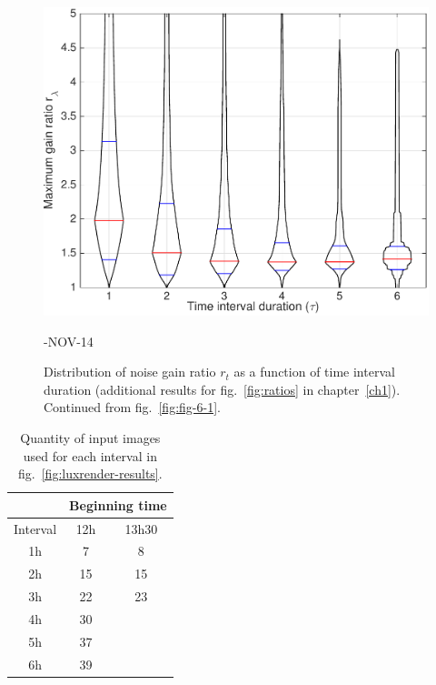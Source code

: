 \begin{figure}
\includegraphics[width=\mylength]{dist/20141114-maxGain-local-relativePerf} \\
\parbox{\mylength}{-NOV-14}
\caption[Distribution of noise gain ratio $r_t$ (cont.)]{Distribution of noise gain ratio $r_t$ as a function of time interval duration (additional results for fig.~\ref{fig:ratios} in chapter~\ref{ch1}). Continued from fig.~\ref{fig:fig-6-1}.}
\label{fig:fig-6-2}
\end{figure}


\FloatBarrier
\begin{table}
\centering
\begin{tabular}{|c|c|c|} \hline
 & \multicolumn{2}{|c|}{Beginning time} \\ \hline
Interval & 12h & 13h30 \\ \hline \hline
1h & 7 & 8 \\ \hline
2h & 15 & 15 \\ \hline
3h & 22 & 23 \\ \hline
4h & 30 &  \\ \hline
5h & 37 &  \\ \hline
6h & 39 &  \\ \hline
\end{tabular}
\vspace{.5em}
\caption[Quantity of input images used for the fined-grained analysis]{Quantity of input images used for each interval in fig.~\ref{fig:luxrender-results}.}
\label{tab:luxrender-qty-input}
\end{table}


